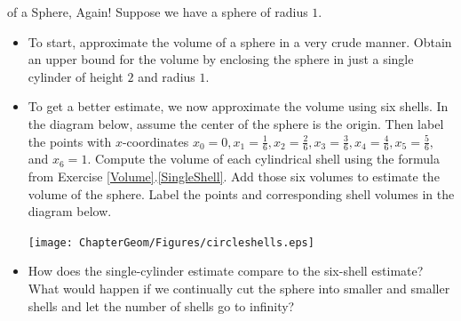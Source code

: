 \begin{exercise}{ of a Sphere, Again! \Coffeecup \Coffeecup} Suppose we have a sphere of radius $1$.  \begin{itemize} \item To start, approximate the volume of a sphere in a very crude manner.  Obtain an upper bound for the volume by enclosing the sphere in just a single cylinder of height $2$ and radius $1$.


\item To get a better estimate, we now approximate the volume using six shells.  In the diagram below, assume the center of the sphere is the origin.  Then label the points with $x$-coordinates $x_0=0,x_1=\frac{1}{6},x_2=\frac{2}{6},x_3=\frac{3}{6},x_4=\frac{4}{6},x_5=\frac{5}{6},$ and $x_6=1$.
Compute the volume of each cylindrical shell using the formula from Exercise \ref{Volume}.\ref{SingleShell}.  Add those six volumes to estimate the volume of the sphere.
Label the points and corresponding shell volumes in the diagram below.

	\begin{center}
		\texttt{[image: ChapterGeom/Figures/circleshells.eps]}
	\end{center} 

\item How does the single-cylinder estimate compare to the six-shell estimate?  What would happen if we continually cut the sphere into smaller and smaller shells and let the number of shells go to infinity?

\end{itemize}
\end{exercise}
